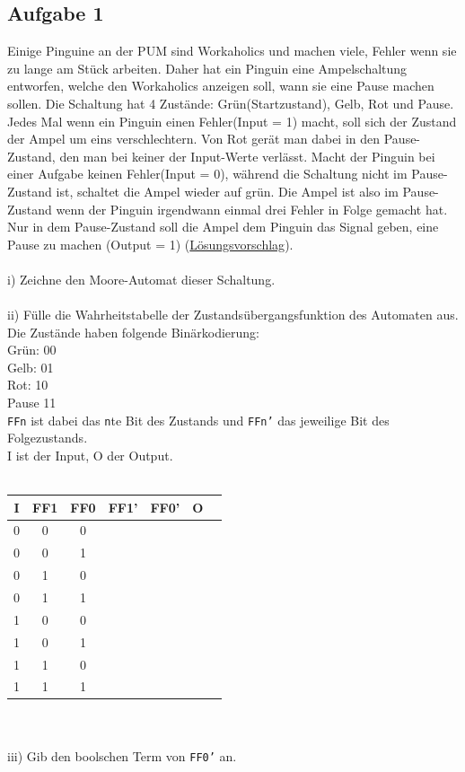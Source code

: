 \documentclass{article}
\begin{document}
\subsection{Aufgabe 1}
Einige Pinguine an der PUM sind Workaholics und machen viele, Fehler wenn sie zu lange am Stück arbeiten. Daher hat ein Pinguin eine Ampelschaltung  entworfen, welche den Workaholics anzeigen soll, wann sie eine Pause machen sollen. Die Schaltung hat 4 Zustände: Grün(Startzustand), Gelb, Rot und Pause. Jedes Mal wenn ein Pinguin einen Fehler(Input = 1) macht, soll sich der Zustand der Ampel um eins verschlechtern. Von Rot gerät man dabei in den Pause-Zustand, den man bei keiner der Input-Werte verlässt. Macht der Pinguin bei einer Aufgabe keinen Fehler(Input = 0), während die Schaltung nicht im Pause-Zustand ist, schaltet die Ampel wieder auf grün. Die Ampel ist also im Pause-Zustand wenn der Pinguin irgendwann einmal drei Fehler in Folge gemacht hat. Nur in dem Pause-Zustand soll die Ampel dem Pinguin das Signal geben, eine Pause zu machen (Output = 1)
(\hyperref[sec:lsg01]{Lösungsvorschlag}). \\
\\
i) Zeichne den Moore-Automat dieser Schaltung.\\
\\
ii) Fülle die Wahrheitstabelle der Zustandsübergangsfunktion des Automaten aus. Die Zustände haben folgende Binärkodierung: \\
Grün: 00 \\
Gelb: 01 \\
Rot: 10 \\
Pause 11 \\
\texttt{FFn} ist dabei das \texttt{n}te Bit des Zustands und \texttt{FFn'} das jeweilige Bit des Folgezustands.\\
I ist der Input, O der Output.\\ 
\\
\begin{tabular}{c|c|c|c|c|c|c}
   I  & FF1 & FF0 & FF1' & FF0' & O \\
    \hline
   0   &  0   & 0   &      &      &   \\
    \hline
   0  &   0  &  1   &      &      &   \\
     \hline
   0  &  1   &  0   &      &      &   \\
     \hline
   0  &   1  &  1   &      &      &   \\
     \hline
   1  &  0   &  0   &      &      &   \\
     \hline
   1  &   0  &  1   &      &      &   \\
     \hline
   1  &  1   &  0   &      &      &   \\
     \hline
   1  &  1   &   1  &      &      &   \\
     \hline
\end{tabular} \\
\\
iii) Gib den boolschen Term von \texttt{FF0'} an.
\end{document}
